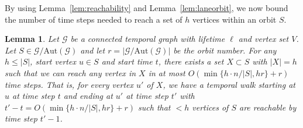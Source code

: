 \documentclass[10pt,a4paper]{article}
\newtheorem{lemma}{Lemma}[section]
\newcommand{\auttg}{\ensuremath{\text{Aut}(\mathcal{G})}}
\newcommand{\torb}{\ensuremath{\mathcal{G}/\auttg}}
\begin{document}
By using Lemma~\ref{lem:reachability} and Lemma~\ref{lem:laneorbit}, we now
bound the number of time steps needed to reach a set of $h$ vertices within an
orbit $S$.

\begin{lemma}\label{lem:nextreachable} Let $\mathcal{G}$ be a connected temporal
graph with lifetime $\ell$ and vertex set $V$. Let $S \in \torb$ and let
$r=|\torb|$ be the orbit number. For any $h \leq |S|$, start vertex {$u \in S$}
{and start time $t$}, there exists a set $X \subset S$ {with $|X|=h$} such that
we can reach any vertex in $X$ in at most $O(\min\{h \cdot n / |S|, h r\}+r)$
time steps. That is, for every vertex $u'$ of $X$, we have a temporal walk
starting at $u$ at time step $t$ and ending at $u'$ at time step $t'$ with
$t'-t=O(\min\{h \cdot n / |S|, h r\}+r)$ {such that $<h$ vertices of $S$ are reachable
by time step $t'-1$.}
\end{lemma}
\end{document}
